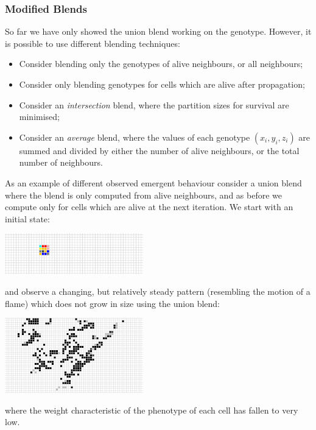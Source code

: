 \documentclass{AISB2008}
\begin{document}
\subsubsection{Modified Blends}

So far we have only showed the union blend working on the genotype. However, it is possible to use different blending techniques:
\begin{itemize}
\item{Consider blending only the genotypes of alive neighbours, or all neighbours;}
\item{Consider only blending genotypes for cells which are alive after propagation;}
\item{Consider an \emph{intersection} blend, where the partition sizes for survival are minimised;}
\item{Consider an \emph{average} blend, where the values of each genotype $(x_i,y_i,z_i)$ are summed and divided by either the number of alive neighbours, or the total number of neighbours.}
\end{itemize}
As an example of different observed emergent behaviour consider a union blend where the blend is only computed from alive neighbours, and as before we compute only for cells which are alive at the next iteration. We start with an initial state:
 \begin{center}
 \includegraphics[width=0.45\textwidth]{init2.jpg}
 \end{center}
and observe a changing, but relatively steady pattern (resembling the motion of a flame) which does not grow in size using the union blend:
 \begin{center}
 \includegraphics[width=0.45\textwidth]{init2_union.jpg}
 \end{center}
\noindent where the weight characteristic of the phenotype of each
cell has fallen to very low.
\end{document}
